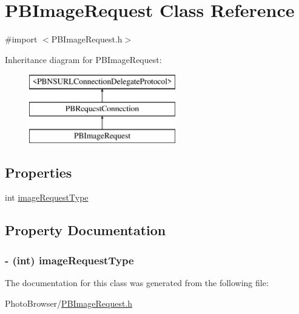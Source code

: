 \hypertarget{interface_p_b_image_request}{
\section{PBImageRequest Class Reference}
\label{interface_p_b_image_request}
}


{\ttfamily \#import $<$PBImageRequest.h$>$}

Inheritance diagram for PBImageRequest:\begin{figure}[H]
\begin{center}
\leavevmode
\includegraphics[height=3cm]{interface_p_b_image_request}
\end{center}
\end{figure}
\subsection*{Properties}
\begin{DoxyCompactItemize}
\item 
int \hyperlink{interface_p_b_image_request_aeee3611d9ca0674a08ded1e3b781d1fa}{imageRequestType}
\end{DoxyCompactItemize}


\subsection{Property Documentation}
\hypertarget{interface_p_b_image_request_aeee3611d9ca0674a08ded1e3b781d1fa}{
\subsubsection[{imageRequestType}]{\setlength{\rightskip}{0pt plus 5cm}-\/ (int) imageRequestType}}
\label{interface_p_b_image_request_aeee3611d9ca0674a08ded1e3b781d1fa}


The documentation for this class was generated from the following file:\begin{DoxyCompactItemize}
\item 
PhotoBrowser/\hyperlink{_p_b_image_request_8h}{PBImageRequest.h}\end{DoxyCompactItemize}
